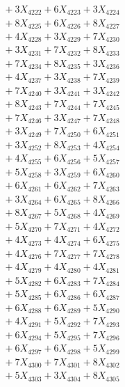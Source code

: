 \documentclass[a4paper,10pt]{article}
\begin{document}
{\begin{align}
&\;  + 3 X_{4222} + 6 X_{4223} + 3 X_{4224} \\[0.3ex]
&\;  + 8 X_{4225} + 6 X_{4226} + 8 X_{4227} \\[0.3ex]
&\;  + 4 X_{4228} + 3 X_{4229} + 7 X_{4230} \\[0.3ex]
&\;  + 3 X_{4231} + 7 X_{4232} + 8 X_{4233} \\[0.3ex]
&\;  + 7 X_{4234} + 8 X_{4235} + 3 X_{4236} \\[0.3ex]
&\;  + 4 X_{4237} + 3 X_{4238} + 7 X_{4239} \\[0.5ex]\allowbreak
&\;  + 7 X_{4240} + 3 X_{4241} + 3 X_{4242} \\[0.3ex]
&\;  + 8 X_{4243} + 7 X_{4244} + 7 X_{4245} \\[0.3ex]
&\;  + 7 X_{4246} + 3 X_{4247} + 7 X_{4248} \\[0.3ex]
&\;  + 3 X_{4249} + 7 X_{4250} + 6 X_{4251} \\[0.3ex]
&\;  + 3 X_{4252} + 8 X_{4253} + 4 X_{4254} \\[0.3ex]
&\;  + 4 X_{4255} + 6 X_{4256} + 5 X_{4257} \\[0.3ex]
&\;  + 5 X_{4258} + 3 X_{4259} + 6 X_{4260} \\[0.3ex]
&\;  + 6 X_{4261} + 6 X_{4262} + 7 X_{4263} \\[0.3ex]
&\;  + 3 X_{4264} + 6 X_{4265} + 8 X_{4266} \\[0.3ex]
&\;  + 8 X_{4267} + 5 X_{4268} + 4 X_{4269} \\[0.5ex]\allowbreak
&\;  + 5 X_{4270} + 7 X_{4271} + 4 X_{4272} \\[0.3ex]
&\;  + 4 X_{4273} + 4 X_{4274} + 6 X_{4275} \\[0.3ex]
&\;  + 4 X_{4276} + 7 X_{4277} + 7 X_{4278} \\[0.3ex]
&\;  + 4 X_{4279} + 4 X_{4280} + 4 X_{4281} \\[0.3ex]
&\;  + 5 X_{4282} + 6 X_{4283} + 7 X_{4284} \\[0.3ex]
&\;  + 5 X_{4285} + 6 X_{4286} + 6 X_{4287} \\[0.3ex]
&\;  + 6 X_{4288} + 6 X_{4289} + 5 X_{4290} \\[0.3ex]
&\;  + 4 X_{4291} + 5 X_{4292} + 7 X_{4293} \\[0.3ex]
&\;  + 6 X_{4294} + 5 X_{4295} + 7 X_{4296} \\[0.3ex]
&\;  + 6 X_{4297} + 6 X_{4298} + 5 X_{4299} \\[0.5ex]\allowbreak
&\;  + 7 X_{4300} + 7 X_{4301} + 8 X_{4302} \\[0.3ex]
&\;  + 5 X_{4303} + 3 X_{4304} + 8 X_{4305} \\[0.3ex]

\end{align}}
\end{document}

